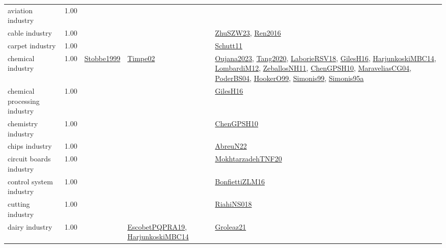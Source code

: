{\begin{longtable}{p{3cm}r>{\raggedright\arraybackslash}p{6cm}>{\raggedright\arraybackslash}p{6cm}>{\raggedright\arraybackslash}p{8cm}}
\index{aviation industry}\index{Industries!aviation industry}aviation industry &  1.00 &  &  & \\
\index{cable industry}\index{Industries!cable industry}cable industry &  1.00 &  &  & \hyperref[detail:ZhuSZW23]{ZhuSZW23}, \hyperref[detail:Ren2016]{Ren2016}\\
\index{carpet industry}\index{Industries!carpet industry}carpet industry &  1.00 &  &  & \hyperref[detail:Schutt11]{Schutt11}\\
\index{chemical industry}\index{Industries!chemical industry}chemical industry &  1.00 & \hyperref[detail:Stobbe1999]{Stobbe1999} & \hyperref[detail:Timpe02]{Timpe02} & \hyperref[detail:Oujana2023]{Oujana2023}, \hyperref[detail:Tang2020]{Tang2020}, \hyperref[detail:LaborieRSV18]{LaborieRSV18}, \hyperref[detail:GilesH16]{GilesH16}, \hyperref[detail:HarjunkoskiMBC14]{HarjunkoskiMBC14}, \hyperref[detail:LombardiM12]{LombardiM12}, \hyperref[detail:ZeballosNH11]{ZeballosNH11}, \hyperref[detail:ChenGPSH10]{ChenGPSH10}, \hyperref[detail:MaraveliasCG04]{MaraveliasCG04}, \hyperref[detail:PoderBS04]{PoderBS04}, \hyperref[detail:HookerO99]{HookerO99}, \hyperref[detail:Simonis99]{Simonis99}, \hyperref[detail:Simonis95a]{Simonis95a}\\
\index{chemical processing industry}\index{Industries!chemical processing industry}chemical processing industry &  1.00 &  &  & \hyperref[detail:GilesH16]{GilesH16}\\
\index{chemistry industry}\index{Industries!chemistry industry}chemistry industry &  1.00 &  &  & \hyperref[detail:ChenGPSH10]{ChenGPSH10}\\
\index{chips industry}\index{Industries!chips industry}chips industry &  1.00 &  &  & \hyperref[detail:AbreuN22]{AbreuN22}\\
\index{circuit boards industry}\index{Industries!circuit boards industry}circuit boards industry &  1.00 &  &  & \hyperref[detail:MokhtarzadehTNF20]{MokhtarzadehTNF20}\\
\index{control system industry}\index{Industries!control system industry}control system industry &  1.00 &  &  & \hyperref[detail:BonfiettiZLM16]{BonfiettiZLM16}\\
\index{cutting industry}\index{Industries!cutting industry}cutting industry &  1.00 &  &  & \hyperref[detail:RiahiNS018]{RiahiNS018}\\
\index{dairy industry}\index{Industries!dairy industry}dairy industry &  1.00 &  & \hyperref[detail:EscobetPQPRA19]{EscobetPQPRA19}, \hyperref[detail:HarjunkoskiMBC14]{HarjunkoskiMBC14} & \hyperref[detail:Groleaz21]{Groleaz21}\\

\end{longtable}}
